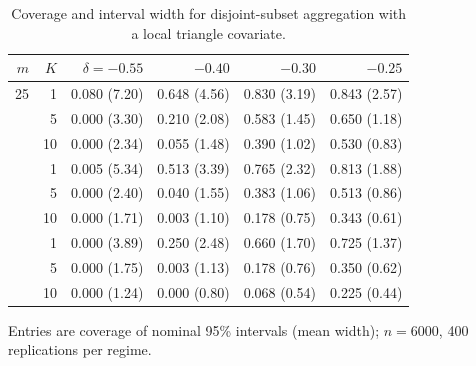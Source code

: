 \begin{table}[tbp]
\centering
\small
\caption{Coverage and interval width for disjoint-subset aggregation with a local triangle covariate.}
\label{tab:disjoint-aggregation-triangle}
\begin{tabular}{@{}rrrrrr@{}}
\toprule
$m$ & $K$ & $\delta=-0.55$ & $-0.40$ & $-0.30$ & $-0.25$ \\
\midrule
25 & 1 & 0.080 (7.20) & 0.648 (4.56) & 0.830 (3.19) & 0.843 (2.57) \\
 & 5 & 0.000 (3.30) & 0.210 (2.08) & 0.583 (1.45) & 0.650 (1.18) \\
 & 10 & 0.000 (2.34) & 0.055 (1.48) & 0.390 (1.02) & 0.530 (0.83) \\
\addlinespace
50 & 1 & 0.005 (5.34) & 0.513 (3.39) & 0.765 (2.32) & 0.813 (1.88) \\
 & 5 & 0.000 (2.40) & 0.040 (1.55) & 0.383 (1.06) & 0.513 (0.86) \\
 & 10 & 0.000 (1.71) & 0.003 (1.10) & 0.178 (0.75) & 0.343 (0.61) \\
\addlinespace
100 & 1 & 0.000 (3.89) & 0.250 (2.48) & 0.660 (1.70) & 0.725 (1.37) \\
 & 5 & 0.000 (1.75) & 0.003 (1.13) & 0.178 (0.76) & 0.350 (0.62) \\
 & 10 & 0.000 (1.24) & 0.000 (0.80) & 0.068 (0.54) & 0.225 (0.44) \\
\bottomrule
\end{tabular}
\par\smallskip
{\footnotesize Entries are coverage of nominal 95\% intervals (mean width); $n=6000$, 400 replications per regime.}
\end{table}

